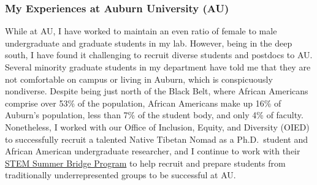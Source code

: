 \subsubsection*{My Experiences at Auburn University (AU)}
While at AU, I have worked to maintain an even ratio of female to male
undergraduate and graduate students in my lab.
However, being in the deep south, I have found it challenging to recruit
diverse students and postdocs to AU.
Several minority graduate students in my department have told me that they are
not comfortable on campus or living in Auburn, which is conspicuously
nondiverse.
Despite being just north of the Black Belt,
where African Americans comprise over 53\% of the population,
African Americans make up
16\% of Auburn's population, less than 7\% of the student body,
and only 4\% of faculty.
Nonetheless, I worked with
our Office of Inclusion, Equity, and Diversity (OIED) to successfully recruit a
talented Native Tibetan Nomad as a Ph.D.\ student
and African American undergraduate researcher,
and I continue to work with their
\href{https://www.auburn.edu/cosam/departments/diversity/summerbridge/index.htm}{STEM Summer Bridge Program}
to help recruit and prepare students from traditionally underrepresented groups
to be successful at AU.


